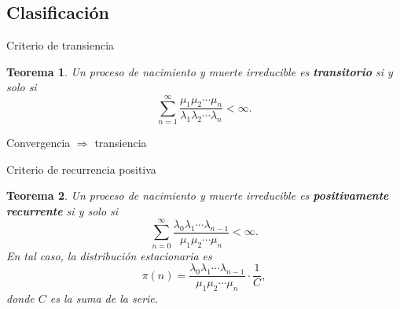 \documentclass[aspectratio=169]{beamer}
\theoremstyle{plain}
\newtheorem{teorema}{Teorema}
\theoremstyle{definition}
\newcommand{\1}{\mathbf{1}}
\begin{document}
\subsection{Clasificación}

\begin{frame}{Criterio de transiencia}
  \begin{teorema}
    Un proceso de nacimiento y muerte irreducible es \textbf{transitorio} si y solo si
    \[ \sum_{n=1}^{\infty} \frac{\mu_1 \mu_2 \cdots \mu_n}{\lambda_1 \lambda_2 \cdots \lambda_n} < \infty. \]
  \end{teorema}
  
  \begin{center}
  \end{center}
  
  \begin{center}
    Convergencia $\Rightarrow$ transiencia
  \end{center}
\end{frame}

\begin{frame}{Criterio de recurrencia positiva}
  \begin{teorema}
    Un proceso de nacimiento y muerte irreducible es \textbf{positivamente recurrente} si y solo si
    \[ \sum_{n=0}^{\infty} \frac{\lambda_0 \lambda_1 \cdots \lambda_{n-1}}{\mu_1 \mu_2 \cdots \mu_n} < \infty. \]
    En tal caso, la distribución estacionaria es
    \[ \pi(n) = \frac{\lambda_0 \lambda_1 \cdots \lambda_{n-1}}{\mu_1 \mu_2 \cdots \mu_n} \cdot \frac{1}{C}, \]
    donde $C$ es la suma de la serie.
  \end{teorema}
  
  \begin{center}
  \end{center}
\end{frame}
\end{document}
